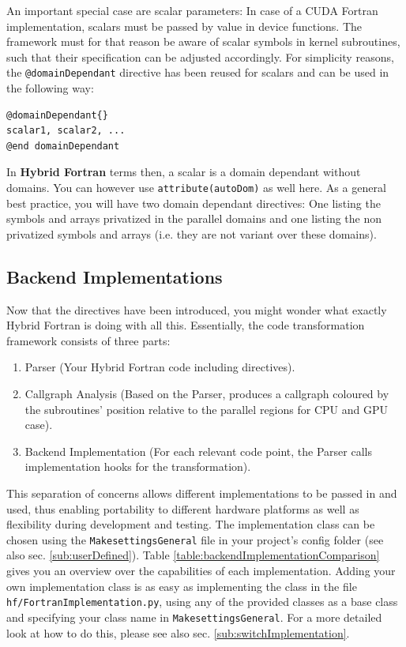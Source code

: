 An important special case are scalar parameters: In case of a CUDA Fortran implementation, scalars must be passed by value in device functions. The framework must for that reason be aware of scalar symbols in kernel subroutines, such that their specification can be adjusted accordingly. For simplicity reasons, the \verb|@domainDependant| directive has been reused for scalars and can be used in the following way:

\begin{lstlisting}[name=domainDependantScalar, label=listing:domainDependantScalar, caption={Domain dependant directive syntax for scalars.}]
@domainDependant{}
scalar1, scalar2, ...
@end domainDependant
\end{lstlisting}

In \textbf{Hybrid Fortran} terms then, a scalar is a domain dependant without domains. You can however use \verb|attribute(autoDom)| as well here. As a general best practice, you will have two domain dependant directives: One listing the symbols and arrays privatized in the parallel domains and one listing the non privatized symbols and arrays (i.e. they are not variant over these domains).

\subsection{Backend Implementations} \label{sub:backendImplementation}

 Now that the directives have been introduced, you might wonder what exactly Hybrid Fortran is doing with all this. Essentially, the code transformation framework consists of three parts:

 \begin{enumerate}
  \item Parser (Your Hybrid Fortran code including directives).
  \item Callgraph Analysis (Based on the Parser, produces a callgraph coloured by the subroutines' position relative to the parallel regions for CPU and GPU case).
  \item Backend Implementation (For each relevant code point, the Parser calls implementation hooks for the transformation).
 \end{enumerate}

 This separation of concerns allows different implementations to be passed in and used, thus enabling portability to different hardware platforms as well as flexibility during development and testing. The implementation class can be chosen using the \verb|MakesettingsGeneral| file in your project's config folder (see also sec. \ref{sub:userDefined}). Table \ref{table:backendImplementationComparison} gives you an overview over the capabilities of each implementation. Adding your own implementation class is as easy as implementing the class in the file \verb|hf/FortranImplementation.py|, using any of the provided classes as a base class and specifying your class name in \verb|MakesettingsGeneral|. For a more detailed look at how to do this, please see also sec. \ref{sub:switchImplementation}.

